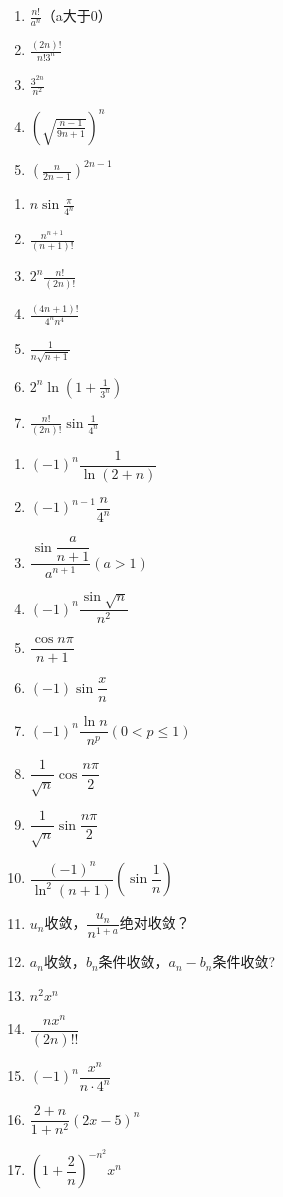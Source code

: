 \documentclass[UTF8,a4paper,12pt,scheme=chinese]{ctexart}
\begin{document}
\begin{Large}
\begin{enumerate}
			\item $\frac{n!}{a^n}$（a大于0）
			\item $\frac{(2n)!}{n!3^n}$
			\item $\frac{3^{2n}}{n^2}$
			\item $\left(\sqrt{\frac{n-1}{9n+1}}\right)^n$
			\item $\left(\frac{n}{2n-1}\right)^{2n-1}$
		\end{enumerate}
		\begin{enumerate}
			\item $n\sin\frac{\pi}{4^n}$
			\item $\frac{n^{n+1}}{(n+1)!}$
			\item $2^n\frac{n!}{(2n)!}$
			\item $\frac{(4n+1)!}{4^nn^4}$
			\item $\frac{1}{n\sqrt{n+1}}$
			\item $2^n\ln(1+\frac{1}{3^n})$
			\item $\frac{n!}{(2n)!}\sin\frac{1}{4^n}$
		\end{enumerate}
		\begin{enumerate}
			\item 	$ (-1)^n\dfrac{1}{\ln(2+n)} $
			\item 	$ (-1)^{n-1}\dfrac{n}{4^n} $
			\item 	$ \dfrac{\sin\dfrac{a}{n+1}}{a^{n+1}}(a>1) $
			\item 	$ (-1)^n\dfrac{\sin\sqrt{n}}{n^2} $
			\item 	$ \dfrac{\cos n \pi}{n+1} $
			\item 	$ (-1)\sin\dfrac{x}{n} $
			\item 	$ (-1)^n\dfrac{\ln n}{n^p}(0<p\leq1) $
			\item 	$ \dfrac{1}{\sqrt{n}}\cos\dfrac{n\pi}{2} $
			\item 	$ \dfrac{1}{\sqrt{n}}\sin\dfrac{n\pi}{2} $
			\item 	$ \dfrac{(-1)^n}{\ln^2(n+1)}(\sin\dfrac{1}{n}) $
			\item 	$ u_n $收敛，$ \dfrac{u_n}{n^{1+a}} $绝对收敛？
			\item 	$ a_n $收敛，$ b_n $条件收敛，$ a_n-b_n $条件收敛?
			\item 	$ n^2x^n $
			\item 	$ \dfrac{nx^n}{(2n)!!} $
			\item 	$ (-1)^n\dfrac{x^n}{n\cdot4^n} $
			\item 	$ \dfrac{2+n}{1+n^2}(2x-5)^n $
			\item 	$ (1+\dfrac{2}{n})^{-n^2}x^n $

\end{enumerate}
\end{Large}
\end{document}
